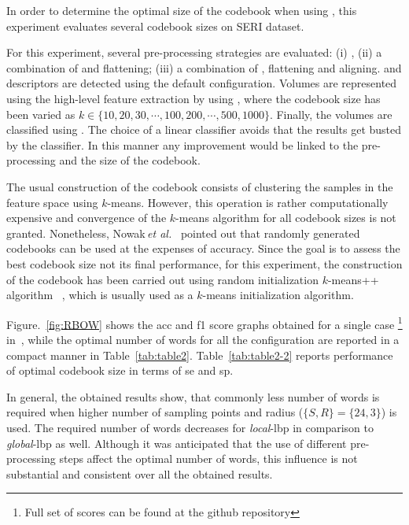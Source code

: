 In order to determine the optimal size of the codebook when using \bow, this experiment evaluates several codebook sizes on SERI dataset.

For this experiment, several pre-processing strategies are evaluated: (i) \nlm, (ii) a combination of \nlm and flattening; (iii) a combination of \nlm, flattening and aligning.
\lbp and \lbptop descriptors are detected using the default configuration.
Volumes are represented using the high-level feature extraction by using \bow, where the codebook size has been varied as $k \in \{10, 20, 30, \cdots, 100, 200, \cdots, 500, 1000\}$.
Finally, the volumes are classified using \lr. The choice of a linear classifier avoids that the results get busted by the classifier. In this manner any improvement would be linked to the pre-processing and the size of the codebook.




The usual construction of the codebook consists of clustering the samples in
the feature space using $k$-means. However, this operation is rather
computationally expensive and convergence of the $k$-means algorithm for all
codebook sizes is not granted.
Nonetheless, Nowak\,\textit{et al.}~\cite{nowak2006sampling} pointed out that randomly generated codebooks can be used at the expenses of accuracy.
Since the goal is to assess the best codebook size not its final performance, for this experiment, the construction of the codebook has been carried out using random initialization $k$-means++ algorithm ~\cite{arthur2007k}, which is usually used as a $k$-means initialization algorithm.

Figure.~\ref{fig:RBOW} shows the \ac{acc} and \ac{f1} score graphs obtained for a single case \footnote{Full set of scores can be found at the github repository} in~\cite{Lemaitre2015}, while the optimal number of words for all the configuration are reported in a compact manner in Table~\ref{tab:table2}.
Table~\ref{tab:table2-2} reports performance of optimal codebook size in terms of \ac{se} and \ac{sp}.

In general, the obtained results show, that commonly less number of words is required when higher number of sampling points and radius ($\{S,R\} = \{24,3\}$) is used.
The required number of words decreases for \emph{local}-\ac{lbp} in comparison to \emph{global}-\ac{lbp} as well.
Although it was anticipated that the use of different pre-processing steps affect the optimal number of words, this influence is not substantial and consistent over all the obtained results.


